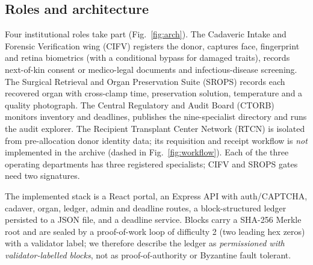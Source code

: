 \documentclass[journal]{IEEEtran}
\newcommand{\cifv}{CIFV}
\newcommand{\srops}{SROPS}
\newcommand{\ctorb}{CTORB}
\newcommand{\rtcn}{RTCN}
\begin{document}
\subsection{Roles and architecture}
Four institutional roles take part (Fig.~\ref{fig:arch}). The Cadaveric
Intake and Forensic Verification wing (\cifv) registers the donor, captures
face, fingerprint and retina biometrics (with a conditional bypass for
damaged traits), records next-of-kin consent or medico-legal documents and
infectious-disease screening. The Surgical Retrieval and Organ Preservation
Suite (\srops) records each recovered organ with cross-clamp time,
preservation solution, temperature and a quality photograph. The Central
Regulatory and Audit Board (\ctorb) monitors inventory and deadlines,
publishes the nine-specialist directory and runs the audit explorer. The
Recipient Transplant Center Network (\rtcn) is isolated from pre-allocation
donor identity data; its requisition and receipt workflow is \emph{not}
implemented in the archive (dashed in Fig.~\ref{fig:workflow}). Each of the
three operating departments has three registered specialists; \cifv{} and
\srops{} gates need two signatures.

The implemented stack is a React portal, an Express API with auth/CAPTCHA,
cadaver, organ, ledger, admin and deadline routes, a block-structured ledger
persisted to a JSON file, and a deadline service. Blocks carry a SHA-256 Merkle
root and are sealed by a proof-of-work loop of difficulty 2 (two leading hex
zeros) with a validator label; we therefore describe the ledger as
\emph{permissioned with validator-labelled blocks}, not as proof-of-authority
or Byzantine fault tolerant.
\end{document}
